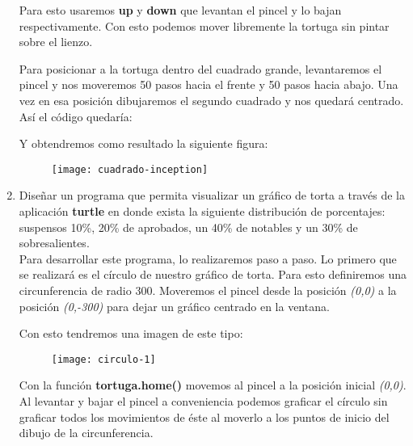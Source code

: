 \begin{enumerate}[{Ejercicio} 1.]
    \asw Para esto usaremos \textbf{up} y \textbf{down} que levantan el pincel y lo bajan respectivamente. Con esto podemos mover libremente la tortuga sin pintar sobre el lienzo.

    Para posicionar a la tortuga dentro del cuadrado grande, levantaremos el pincel y nos moveremos 50 pasos hacia el frente y 50 pasos hacia abajo. Una vez en esa posición dibujaremos el segundo cuadrado y nos quedará centrado. Así el código quedaría:\\

    \begin{listing}[H]
    \end{listing}

    Y obtendremos como resultado la siguiente figura:\\

    \begin{figure}[H]
        \centering
        \texttt{[image: cuadrado-inception]}
    \end{figure}

    \item Diseñar un programa que permita visualizar un gráfico de torta a través de la aplicación \textbf{turtle} en donde exista la siguiente distribución de porcentajes: suspensos 10\%, 20\% de aprobados, un 40\% de notables y un 30\% de sobresalientes.\\
    
    \asw Para desarrollar este programa, lo realizaremos paso a paso. Lo primero que se realizará es el círculo de nuestro gráfico de torta. Para esto definiremos una circunferencia de radio 300. Moveremos el pincel desde la posición \textit{(0,0)} a la posición \textit{(0,-300)} para dejar un gráfico centrado en la ventana.\\

    \begin{listing}[H]
    \end{listing}

    Con esto tendremos una imagen de este tipo:\\

    \begin{figure}[H]
        \centering
        \texttt{[image: circulo-1]}
    \end{figure}

    Con la función \textbf{tortuga.home()} movemos al pincel a la posición inicial \textit{(0,0)}. Al levantar y bajar el pincel a conveniencia podemos graficar el círculo sin graficar todos los movimientos de éste al moverlo a los puntos de inicio del dibujo de la circunferencia.


\end{enumerate}
